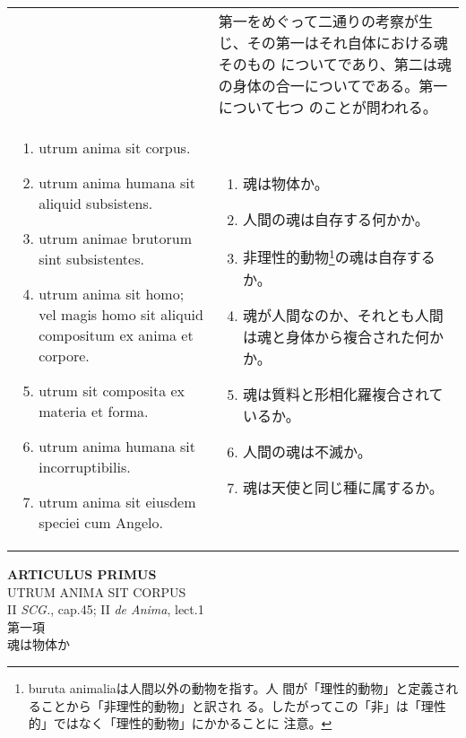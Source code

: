\documentclass[paper=a4paper,fontsize=10pt,jafontsize=9pt,titlepage]{jlreq}
\begin{document}
\begin{longtable}{p{21em}p{21em}}
&

第一をめぐって二通りの考察が生じ、その第一はそれ自体における魂そのもの
 についてであり、第二は魂の身体の合一についてである。第一について七つ
 のことが問われる。

\\

\begin{enumerate}
 \item utrum anima sit corpus.
 \item utrum anima humana sit aliquid subsistens.
 \item utrum animae brutorum sint subsistentes.
 \item utrum anima sit homo; vel magis homo sit aliquid compositum ex anima et corpore.
 \item utrum sit composita ex materia et forma.
 \item utrum anima humana sit incorruptibilis.
 \item utrum anima sit eiusdem speciei cum Angelo.
\end{enumerate}

&

\begin{enumerate}
 \item 魂は物体か。
 \item 人間の魂は自存する何かか。
 \item 非理性的動物\footnote{buruta animaliaは人間以外の動物を指す。人
       間が「理性的動物」と定義されることから「非理性的動物」と訳され
       る。したがってこの「非」は「理性的」ではなく「理性的動物」にかかることに
       注意。}の魂は自存するか。
 \item 魂が人間なのか、それとも人間は魂と身体から複合された何かか。
 \item 魂は質料と形相化羅複合されているか。
 \item 人間の魂は不滅か。
 \item 魂は天使と同じ種に属するか。
\end{enumerate}

\end{longtable}

\newpage
{}
\begin{center}
{\Large {\bfseries ARTICULUS PRIMUS}}\\
{\large UTRUM ANIMA SIT CORPUS}\\
{\footnotesize II {\itshape SCG.}, cap.45; II {\itshape de Anima}, lect.1}\\
{\Large 第一項\\魂は物体か}
\end{center}
\end{document}
